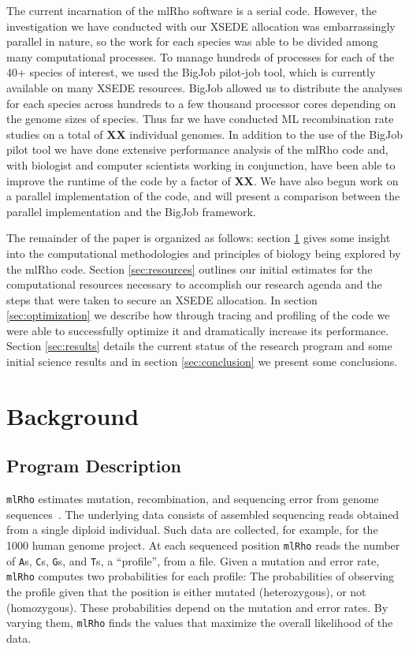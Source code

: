 \documentclass{sig-alternate}
\newcommand{\ty}{\texttt}
\begin{document}
The current incarnation of the mlRho software is a serial code. However, the investigation we have conducted
with our XSEDE allocation was embarrassingly parallel in nature, so the work for each species was able to be
divided among many computational processes. To manage hundreds of processes for each of the 40+ species of
interest, we used the BigJob pilot-job tool, which is currently available on many XSEDE resources. BigJob
allowed us to distribute the analyses for each species across hundreds to a few thousand processor cores
depending on the genome sizes of species. Thus far we have conducted ML recombination rate studies on a total
of {\bf XX} individual genomes. In addition to the use of the BigJob pilot tool we have done extensive performance
analysis of the mlRho code and, with biologist and computer scientists working in conjunction, have been able
to improve the runtime of the code by a factor of {\bf XX}. We have also begun work on a parallel
implementation of the code, and will present a comparison between the parallel implementation and the BigJob
framework.

The remainder of the paper is organized as follows: section \ref{sec:background} gives some insight into the
computational methodologies and principles of biology being explored by the mlRho code. Section
\ref{sec:resources} outlines our initial estimates for the computational resources necessary to accomplish our
research agenda and the steps that were taken to secure an XSEDE allocation. In section \ref{sec:optimization}
we describe how through tracing and profiling of the code we were able to successfully optimize it and
dramatically increase its performance. Section \ref{sec:results} details the current status of the research
program and some initial science results and in section \ref{sec:conclusion} we present some conclusions.


\section{Background}\label{sec:background}

\subsection{Program Description}
\texttt{mlRho} estimates mutation, recombination, and sequencing error
from genome sequences~\cite{hau10:mlr}. The underlying data consists of
assembled sequencing reads obtained from a single diploid
individual. Such data are collected, for example, for the 1000 human
genome project. At each sequenced position \texttt{mlRho} reads the number
of \ty{A}s, \ty{C}s, \ty{G}s, and \ty{T}s, a ``profile'', from a
file. Given a mutation and error rate, \ty{mlRho} computes two
probabilities for each profile: The probabilities of observing the
profile given that the position is either mutated (heterozygous), or
not (homozygous). These probabilities depend on the mutation
and error rates. By varying them, \ty{mlRho} finds the values that
maximize the overall likelihood of the data.
\end{document}

